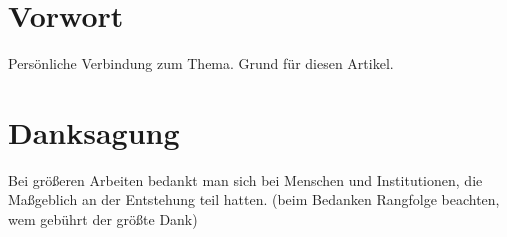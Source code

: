 \documentclass[12pt,a4paper]{scrartcl}
\begin{document}
	
	
	
	
	\clearpage
	\section*{Vorwort}
	
	Persönliche Verbindung zum Thema. Grund für diesen Artikel. 
	
	
	\clearpage
	\section*{Danksagung}
	
	Bei größeren Arbeiten bedankt man sich bei Menschen und Institutionen, die Maßgeblich an der Entstehung teil hatten. (beim Bedanken Rangfolge beachten, wem gebührt der größte Dank) \\
	
\end{document}
